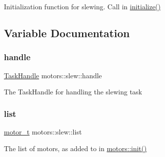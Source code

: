 Initialization function for slewing. Call in \hyperlink{main_8h_a25a40b6614565f755233080a384c35f1}{initialize()} 

\subsection{Variable Documentation}
\mbox{\label{namespacemotors_1_1slew_ac3ee7020adfbe186103f5a8a027eb8fb}} 
\subsubsection{\texorpdfstring{handle}{handle}}
{\footnotesize\ttfamily \hyperlink{API_8h_a23dca3c0de10682afb982677ff292f77}{Task\+Handle} motors\+::slew\+::handle}

The Task\+Handle for handling the slewing task \mbox{\label{namespacemotors_1_1slew_a80ca3dc0e033fa8ad84aa8ce77765e3b}} 
\subsubsection{\texorpdfstring{list}{list}}
{\footnotesize\ttfamily \hyperlink{structmotor__t}{motor\+\_\+t} motors\+::slew\+::list}

The list of motors, as added to in \hyperlink{namespacemotors_ac24174d8f1da14c7577c91249e35c2e6}{motors\+::init()} 